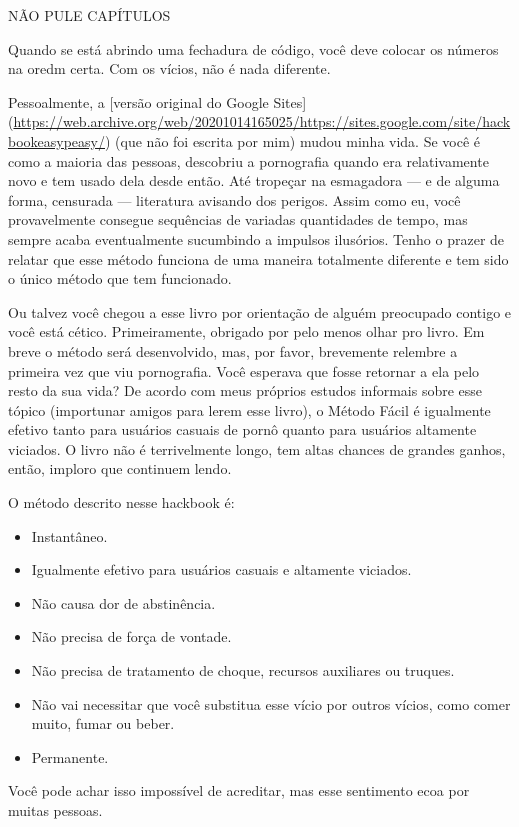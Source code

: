 \documentclass[
  spanish,
  openany]{book}
\providecommand{\tightlist}{%
  \setlength{\itemsep}{0pt}\setlength{\parskip}{0pt}}
\let\oldurl\url
\renewcommand\url{\renewcommand\UrlFont{\ttfamily\color{linkcolor}}\oldurl}
\begin{document}
{NÃO PULE CAPÍTULOS}

Quando se está abrindo uma fechadura de código, você deve colocar os números na oredm certa. Com os vícios, não é nada diferente.

Pessoalmente, a {[}versão original do Google Sites{]} (\url{https://web.archive.org/web/20201014165025/https://sites.google.com/site/hackbookeasypeasy/}) (que não foi escrita por mim) mudou minha vida. Se você é como a maioria das pessoas, descobriu a pornografia quando era relativamente novo e tem usado dela desde então. Até tropeçar na esmagadora --- e de alguma forma, censurada ---
literatura avisando dos perigos. Assim como eu, você provavelmente consegue sequências de variadas quantidades de tempo, mas sempre acaba eventualmente sucumbindo a impulsos ilusórios. Tenho o prazer de relatar que esse método funciona de uma maneira totalmente diferente e tem sido o único método que tem funcionado.

Ou talvez você chegou a esse livro por orientação de alguém preocupado contigo e você está cético. Primeiramente, obrigado por pelo menos olhar pro livro. Em breve o método será desenvolvido, mas, por favor, brevemente relembre a primeira vez que viu pornografia. Você esperava que fosse retornar a ela pelo resto da sua vida? De acordo com meus próprios estudos informais sobre esse tópico (importunar amigos para lerem esse livro), o Método Fácil é igualmente efetivo tanto para usuários casuais de pornô quanto para usuários altamente viciados. O livro não é terrivelmente longo, tem altas chances de grandes ganhos, então, imploro que continuem lendo.

O método descrito nesse hackbook é:

\begin{itemize}
\tightlist
\item
  Instantâneo.
\item
  Igualmente efetivo para usuários casuais e altamente viciados.
\item
  Não causa dor de abstinência.
\item
  Não precisa de força de vontade.
\item
  Não precisa de tratamento de choque, recursos auxiliares ou truques.
\item
  Não vai necessitar que você substitua esse vício por outros vícios, como comer muito, fumar ou beber.
\item
  Permanente.
\end{itemize}

Você pode achar isso impossível de acreditar, mas esse sentimento ecoa por muitas pessoas.
\end{document}

